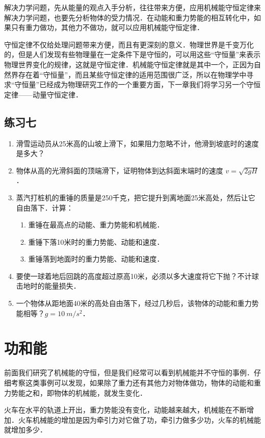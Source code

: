 解决力学问题，先从能量的观点入手分析，往往带来方便，应用机械能守恒定律来解决力学问题，也要先分析物体的受力情况．在动能和重力势能的相互转化中，如果只有重力做功，其他力不做功，就可以应用机械能守恒定律．

守恒定律不仅给处理问题带来方便，而且有更深刻的意义．物理世界是千变万化的，但是人们发现有些物理量在一定条件下是守恒的，可以用这些“守恒量”来表示物理世界变化的规律，这就是守恒定律．机械能守恒定律就是其中一个，正因为自然界存在着“守恒量”，而且某些守恒定律的适用范围很广泛，所以在物理学中寻求“守恒量”已经成为物理研究工作的一个重要方面，下一章我们将学习另一个守恒定律——动量守恒定律．

\subsection*{练习七}
\begin{enumerate}
    \item 滑雪运动员从25米高的山坡上滑下，如果阻力忽略不计，他滑到坡底时的速度是多大？
    \item 物体从高的光滑斜面的顶端滑下，证明物体到达斜面末端时的速度 $v=\sqrt{2gH}$．
    \item 蒸汽打桩机的重锤的质量是250千克，把它提升到离地面25米高处，然后让它自由落下．计算：
          \begin{enumerate}
              \item 重锤在最高点的动能、重力势能和机械能．
              \item 重锤下落10米时的重力势能、动能和速度．
              \item 重锤落到地面时的重力势能、动能和速度．
          \end{enumerate}
    \item 要使一球着地后回跳的高度超过原高10米，必须以多大速度将它下抛？不计球击地时的能量损失．
    \item 一个物体从距地面40米的高处自由落下，经过几秒后，该物体的动能和重力势能相等？$g=\qty{10}{m/s^{2}}$．
\end{enumerate}
\newpage
\section{功和能}
前面我们研究了机械能的守恒，但是我们经常可以看到机械能并不守恒的事例．仔细考察这类事例可以发现，如果除了重力还有其他力对物体做功，物体的动能和重力势能之和，即物体的机械能，就发生变化．

火车在水平的轨道上开出，重力势能没有变化，动能越来越大，机械能在不断增加．火车机械能的增加是因为牵引力对它做了功，牵引力做多少功，火车的机械能就增加多少．

